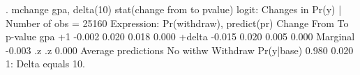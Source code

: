 . mchange gpa, delta(10) stat(change from to pvalue)
{\smallskip}
logit: Changes in Pr(y) | Number of obs = 25160
{\smallskip}
Expression: Pr(withdraw), predict(pr)
{\smallskip}
             {\VBAR}    Change       From         To    p-value 
gpa          {\VBAR}                                            
          +1 {\VBAR}    -0.002      0.020      0.018      0.000 
      +delta {\VBAR}    -0.015      0.020      0.005      0.000 
    Marginal {\VBAR}    -0.003         .z         .z      0.000 
{\smallskip}
Average predictions
{\smallskip}
             {\VBAR} No with{\tytilde}w   Withdraw 
  Pr(y|base) {\VBAR}     0.980      0.020 
{\smallskip}
1: Delta equals 10.
{\smallskip}
